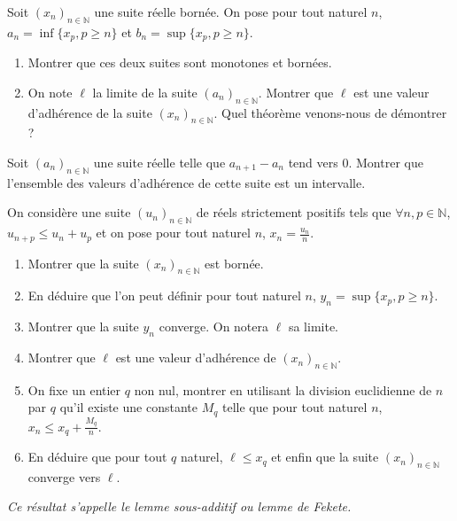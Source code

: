\begin{exercice}
Soit $(x_{n})_{n\in\mathbb{N}}$ une suite réelle bornée. On pose pour tout naturel $n$,
$a_{n}=\inf\{x_{p},p\ge n\}$ et $b_{n}=\sup\{x_{p},p\ge n\}$.
\begin{enumerate}
    \item Montrer que ces deux suites sont monotones et bornées.
    \item On note $\ell$ la limite de la suite $(a_{n})_{n\in\mathbb{N}}$. Montrer que $\ell$ est une valeur d'adhérence de la suite $(x_{n})_{n\in\mathbb{N}}$.
    Quel théorème venons-nous de démontrer ?
\end{enumerate}
\end{exercice}

\begin{exercice}
Soit $(a_{n})_{n\in\mathbb{N}}$ une suite réelle telle que $a_{n+1}-a_{n}$ tend vers 0.
Montrer que l'ensemble des valeurs d'adhérence de cette suite est un intervalle.
\end{exercice}

\begin{exercice}
On considère une suite $(u_{n})_{n\in\mathbb{N}}$ de réels strictement positifs tels que $\forall n,p\in\mathbb{N}$, $u_{n+p}\le u_{n}+u_{p}$ et on pose pour tout naturel $n$, $x_{n}=\frac{u_{n}}{n}$.
\begin{enumerate}
    \item Montrer que la suite $(x_{n})_{n\in\mathbb{N}}$ est bornée.
    \item En déduire que l'on peut définir pour tout naturel $n$, $y_{n}=\sup\{x_{p}, p\ge n\}$.
    \item Montrer que la suite $y_{n}$ converge. On notera $\ell$ sa limite.
    \item Montrer que $\ell$ est une valeur d'adhérence de $(x_{n})_{n\in\mathbb{N}}$.
    \item On fixe un entier $q$ non nul, montrer en utilisant la division euclidienne de $n$ par $q$ qu'il existe une constante $M_{q}$ telle que pour tout naturel $n$, $x_{n}\le x_{q}+\frac{M_{q}}{n}$.
    \item En déduire que pour tout $q$ naturel, $\ell\le x_{q}$ et enfin que la suite $(x_{n})_{n\in\mathbb{N}}$ converge vers $\ell$.
\end{enumerate}
\textit{Ce résultat s'appelle le lemme sous-additif ou lemme de Fekete.}
\end{exercice}

